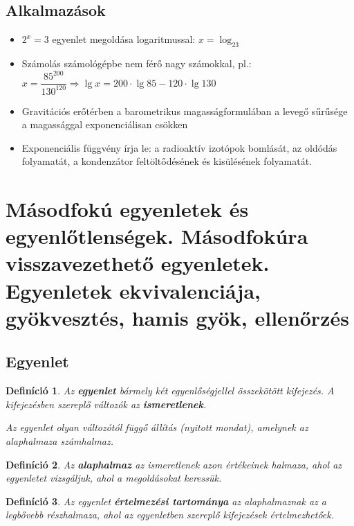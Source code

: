 \documentclass[12pt,a4paper]{article}
\newtheorem{definition}{Definíció} [section]
\begin{document}
\subsection{Alkalmazások}
\begin{itemize}
\item $2^x=3$ egyenlet megoldása logaritmussal: $x=\log_23$
\item Számolás számológépbe nem férő nagy számokkal, pl.: $x=\dfrac{85^{200}}{130^{120}} \Rightarrow \lg x= 200\cdot \lg 85 - 120\cdot \lg 130$
\item Gravitációs erőtérben a barometrikus magasságformulában a levegő sűrűsége a magassággal exponenciálisan csökken
\item  Exponenciális függvény írja le: a radioaktív izotópok bomlását, az oldódás folyamatát, a kondenzátor feltöltődésének és kisülésének folyamatát.
\end{itemize}
\newpage



\section{Másodfokú egyenletek és egyenlőtlenségek. Másodfokúra visszavezethető egyenletek. Egyenletek ekvivalenciája, gyökvesztés, hamis gyök, ellenőrzés}

\subsection{Egyenlet}

\begin{definition}
Az \textbf{egyenlet} bármely két egyenlőségjellel összekötött kifejezés. A kifejezésben szereplő változók az \textbf{ismeretlenek}.

Az egyenlet olyan változótól függő állítás (nyitott mondat), amelynek az alaphalmaza számhalmaz.
\end{definition}

\begin{definition}
Az \textbf{alaphalmaz} az ismeretlenek azon értékeinek halmaza, ahol az egyenletet vizsgáljuk, ahol a megoldásokat keressük.
\end{definition}

\begin{definition}
Az egyenlet \textbf{értelmezési tartománya} az alaphalmaznak az a legbővebb részhalmaza, ahol az egyenletben szereplő kifejezések értelmezhetőek.
\end{definition}
\end{document}
